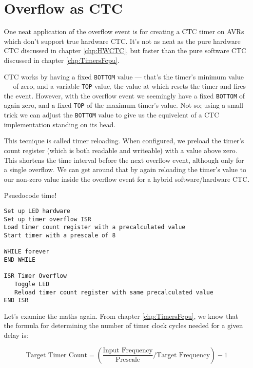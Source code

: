 \documentclass[a4paper,oneside]{book}
\begin{document}
\label{chp:OverflowCTC}
\chapter{Overflow as CTC}

One neat application of the overflow event is for creating a CTC timer on AVRs which don't support true hardware CTC. It's not as neat as the pure hardware CTC discussed in chapter \ref{chp:HWCTC}, but faster than the pure software CTC discussed in chapter \ref{chp:TimersFcpu}.

CTC works by having a fixed \texttt{BOTTOM} value --- that's the timer's minimum value --- of zero, and a variable \texttt{TOP} value, the value at which resets the timer and fires the event. However, with the overflow event we seemingly have a fixed \texttt{BOTTOM} of again zero, and a fixed \texttt{TOP} of the maximum timer's value. Not so; using a small trick we can adjust the \texttt{BOTTOM} value to give us the equivelent of a CTC implementation standing on its head.

This tecnique is called timer reloading. When configured, we preload the timer's count register (which is both readable and writeable) with a value above zero. This shortens the time interval before the next overflow event, although only for a single overflow. We can get around that by again reloading the timer's value to our non-zero value inside the overflow event for a hybrid software/hardware CTC.

Psuedocode time!

\begin{center}
\begin{lstlisting}[keywordstyle=\color{black},commentstyle=\color{black}]
Set up LED hardware
Set up timer overflow ISR
Load timer count register with a precalculated value
Start timer with a prescale of 8

WHILE forever
END WHILE

ISR Timer Overflow
   Toggle LED
   Reload timer count register with same precalculated value
END ISR
\end{lstlisting}
\end{center}

Let's examine the maths again. From chapter \ref{chp:TimersFcpu}, we know that the formula for determining the number of timer clock cycles needed for a given delay is: 

\begin{displaymath}
\text{Target Timer Count} = (\frac{\text{Input Frequency}}{\text{Prescale}} / \text{Target Frequency}) - 1  
\end{displaymath}
\end{document}

